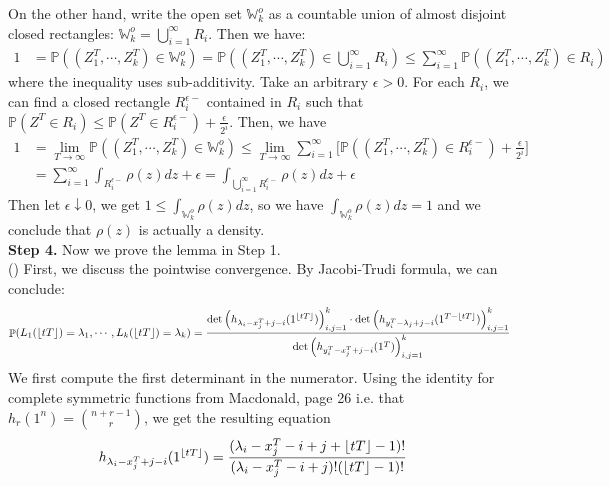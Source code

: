 \documentclass[12pt]{article}
\DeclareMathOperator{\pr}{\mathbb{P}}
\DeclarePairedDelimiter\floor{\lfloor}{\rfloor}
\begin{document}
On the other hand, write the open set $\mathbb{W}_{k}^{o}$ as a countable union of almost disjoint closed rectangles: $\mathbb{W}_{k}^{o}=\bigcup_{i=1}^{\infty}R_{i}$. Then we have:
\begin{align*}
	1&=\mathbb{P}((Z_{1}^{T},\cdots,Z_{k}^{T})\in \mathbb{W}_{k}^{o})=\mathbb{P}((Z_{1}^{T},\cdots,Z_{k}^{T})\in \bigcup_{i=1}^{\infty}R_{i})\leqslant\sum_{i=1}^{\infty}\mathbb{P}((Z_{1}^{T},\cdots,Z_{k}^{T})\in R_{i})
\end{align*}
where the inequality uses sub-additivity. Take an arbitrary $\epsilon>0$. For each $R_{i}$, we can find a closed rectangle $R_{i}^{\epsilon-}$ contained in $R_{i}$ such that $\mathbb{P}(Z^{T}\in R_{i})\leqslant \mathbb{P}(Z^{T}\in R_{i}^{\epsilon-})+\frac{\epsilon}{2^{i}}$. Then, we have
\begin{align*}
	1&=\lim_{T\rightarrow\infty}\mathbb{P}((Z_{1}^{T},\cdots,Z_{k}^{T})\in \mathbb{W}_{k}^{o})\leqslant \lim_{T\rightarrow\infty}\sum_{i=1}^{\infty}\big[\mathbb{P}((Z_{1}^{T},\cdots,Z_{k}^{T})\in R_{i}^{\epsilon-})+\frac{\epsilon}{2^{i}}\big]\\
	&=\sum_{i=1}^{\infty}\int_{R_{i}^{\epsilon-}}\rho(z)dz+\epsilon=\int_{\bigcup_{i=1}^{\infty}R_{i}^{\epsilon-}}\rho(z)dz+\epsilon
\end{align*}
Then let $\epsilon\downarrow 0$, we get $1\leqslant\int_{\mathbb{W}_{k}^{o}}\rho(z)dz$, so we have $\int_{\mathbb{W}_{k}^{o}}\rho(z)dz=1$ and we conclude that $\rho(z)$ is actually a density.\\
\textbf{Step 4. }Now we prove the lemma in Step 1. \\
() First, we discuss the pointwise convergence. By Jacobi-Trudi formula, we can conclude:
\begin{align*}
\pr(L_1(\lfloor tT\rfloor)=\lambda_1,\cdots, L_k(\lfloor tT\rfloor)=\lambda_k)=\frac{\det\left(h_{\lambda_i-x_j^T+j-i}(1^{\floor{tT}})\right)_{i,j=1}^k\cdot\det\left(h_{y_i^T-\lambda_j+j-i}(1^{T-\floor{tT}})\right)_{i,j=1}^k}{\det\left(h_{y_i^{T}-x_j^T+j-i}(1^T)\right)_{i,j=1}^k}	
\end{align*}
We first compute the first determinant in the numerator. Using the identity for complete symmetric functions from Macdonald, page 26 i.e. that $h_r(1^n)=\binom{n+r-1}{r}$, we get the resulting equation 
\begin{align*}
h_{\lambda_i-x_j^T+j-i}(1^{\floor{tT}})&=\frac{(\lambda_{i}-x_{j}^{T}-i+j+\lfloor tT \rfloor -1)!}{(\lambda_{i}-x_{j}^{T}-i+j)!(\lfloor tT \rfloor -1)!}
\end{align*}
\end{document}
